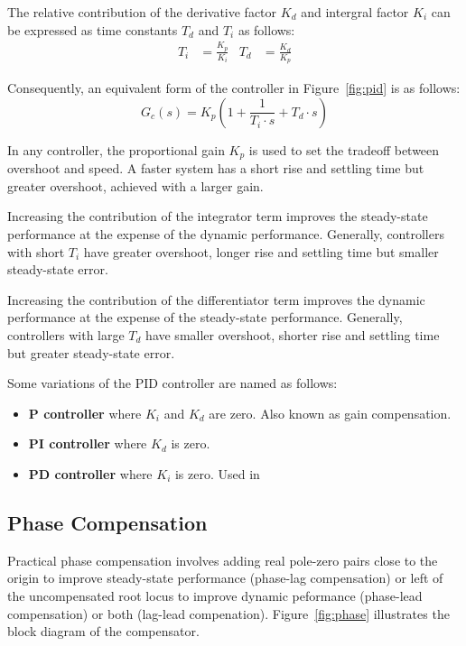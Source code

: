 \documentclass[a4paper,10pt,twocolumn]{article}
\begin{document}
The relative contribution of the derivative factor $K_d$ and intergral factor $K_i$ can be expressed as time constants $T_d$ and $T_i$ as follows:
\begin{align} \label{eq:T_i}
	T_i &= \frac{K_p}{K_i} & T_d &= \frac{K_d}{K_p}
\end{align}

Consequently, an equivalent form of the controller in Figure~\ref{fig:pid} is as follows:
\begin{equation}
	G_c(s) = K_p\left(1 + \frac{1}{T_i \cdot s} + T_d \cdot s\right)
\end{equation}

In any controller, the proportional gain $K_p$ is used to set the tradeoff between overshoot and speed. A faster system has a short rise and settling time but greater overshoot, achieved with a larger gain.

Increasing the contribution of the integrator term improves the steady-state performance at the expense of the dynamic performance. Generally, controllers with short $T_i$ have greater overshoot, longer rise and settling time but smaller steady-state error.

Increasing the contribution of the differentiator term improves the dynamic performance at the expense of the steady-state performance. Generally, controllers with large $T_d$ have smaller overshoot, shorter rise and settling time but greater steady-state error.

Some variations of the PID controller are named as follows:
\begin{itemize} \itemsep0pt
	\item \textbf{P controller} where $K_i$ and $K_d$ are zero. Also known as gain compensation.
	\item \textbf{PI controller} where $K_d$ is zero.
	\item \textbf{PD controller} where $K_i$ is zero. Used in 
\end{itemize}

\subsection{Phase Compensation}

Practical phase compensation involves adding real pole-zero pairs close to the origin to improve steady-state performance (phase-lag compensation) or left of the uncompensated root locus to improve dynamic peformance (phase-lead compensation) or both (lag-lead compenation). Figure~\ref{fig:phase} illustrates the block diagram of the compensator.
\end{document}
